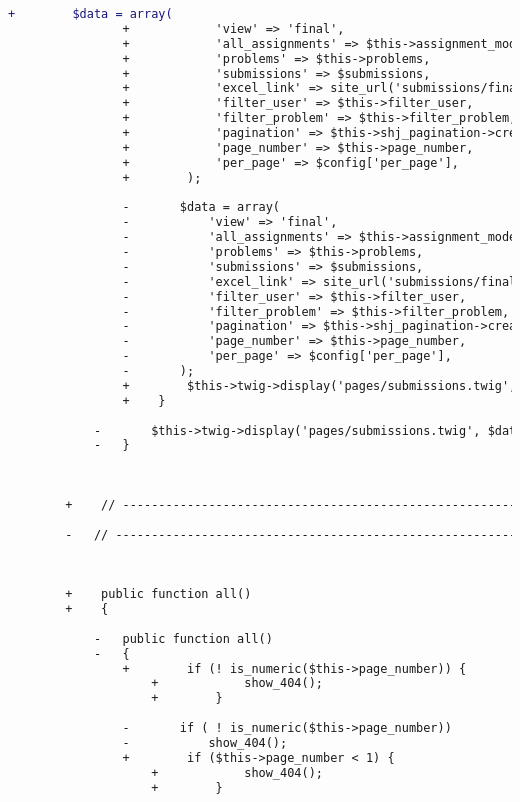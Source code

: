 \begin{lstlisting}[language=diff, caption=Perubahan pada kode Submissions.php]
				+        $data = array(
				+            'view' => 'final',
				+            'all_assignments' => $this->assignment_model->all_assignments(),
				+            'problems' => $this->problems,
				+            'submissions' => $submissions,
				+            'excel_link' => site_url('submissions/final_excel'.($this->filter_user ? '/user/'.$this->filter_user : '').($this->filter_problem ? '/problem/'.$this->filter_problem : '')),
				+            'filter_user' => $this->filter_user,
				+            'filter_problem' => $this->filter_problem,
				+            'pagination' => $this->shj_pagination->create_links(),
				+            'page_number' => $this->page_number,
				+            'per_page' => $config['per_page'],
				+        );
				
				-		$data = array(
				-			'view' => 'final',
				-			'all_assignments' => $this->assignment_model->all_assignments(),
				-			'problems' => $this->problems,
				-			'submissions' => $submissions,
				-			'excel_link' => site_url('submissions/final_excel'.($this->filter_user?'/user/'.$this->filter_user:'').($this->filter_problem?'/problem/'.$this->filter_problem:'')),
				-			'filter_user' => $this->filter_user,
				-			'filter_problem' => $this->filter_problem,
				-			'pagination' => $this->shj_pagination->create_links(),
				-			'page_number' => $this->page_number,
				-			'per_page' => $config['per_page'],
				-		);
				+        $this->twig->display('pages/submissions.twig', $data);
				+    }
			
			-		$this->twig->display('pages/submissions.twig', $data);
			-	}
		
		
		
		+    // ------------------------------------------------------------------------
		
		-	// ------------------------------------------------------------------------
		
		
		
		+    public function all()
		+    {
			
			-	public function all()
			-	{
				+        if (! is_numeric($this->page_number)) {
					+            show_404();
					+        }
				
				-		if ( ! is_numeric($this->page_number))
				-			show_404();
				+        if ($this->page_number < 1) {
					+            show_404();
					+        }
				

\end{lstlisting}
